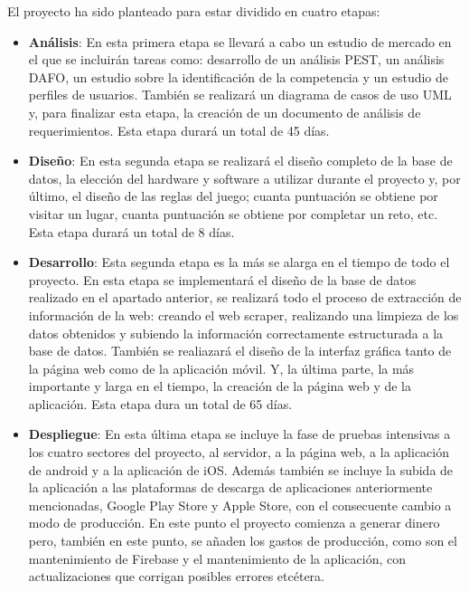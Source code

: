 \documentclass{report}
\begin{document}
El proyecto ha sido planteado para estar dividido en cuatro etapas:
\begin{itemize}
\item \textbf{Análisis}: En esta primera etapa se llevará a cabo un estudio de mercado en el que se incluirán tareas como: desarrollo de un análisis PEST, un análisis DAFO, un estudio sobre la identificación de la competencia y un estudio de perfiles de usuarios. También se realizará un diagrama de casos de uso UML y, para finalizar esta etapa, la creación de un documento de análisis de requerimientos. Esta etapa durará un total de 45 días.

\item \textbf{Diseño}: En esta segunda etapa se realizará el diseño completo de la base de datos, la elección del hardware y software a utilizar durante el proyecto y, por último, el diseño de las reglas del juego; cuanta puntuación se obtiene por visitar un lugar, cuanta puntuación se obtiene  por completar un reto, etc. Esta etapa durará un total de 8 días.

\item \textbf{Desarrollo}: Esta segunda etapa es la más se alarga en el tiempo de todo el proyecto. En esta etapa se implementará el diseño de la base de datos realizado en el apartado anterior, se realizará todo el proceso de extracción de información de la web: creando el web scraper, realizando una limpieza de los datos obtenidos y subiendo la información correctamente estructurada a la base de datos. También se realiazará el diseño de la interfaz gráfica tanto de la página web como de la aplicación móvil. Y, la última parte, la más importante y larga en el tiempo, la creación de la página web y de la aplicación. Esta etapa dura un total de 65 días.

\item \textbf{Despliegue}: En esta última etapa se incluye la fase de pruebas intensivas a los cuatro sectores del proyecto, al servidor, a la página web, a la aplicación de android y a la aplicación de iOS. Además también se incluye la subida de la aplicación a las plataformas de descarga de aplicaciones anteriormente mencionadas, Google Play Store  y Apple Store, con el consecuente cambio a modo de producción. En este punto el proyecto comienza a generar dinero pero, también en este punto, se añaden los gastos de producción, como son el mantenimiento de Firebase y el mantenimiento de la aplicación, con actualizaciones que corrigan posibles errores etcétera.
\end{itemize}
\end{document}
